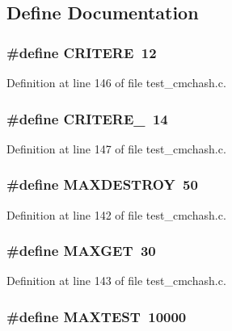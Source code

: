 \subsection{Define Documentation}
\subsubsection[{CRITERE}]{\setlength{\rightskip}{0pt plus 5cm}\#define CRITERE~12}\label{test__cmchash_8c_b2da1e226a5beeff3269ec19b1f2b0b9}




Definition at line 146 of file test\_\-cmchash.c.
\subsubsection[{CRITERE\_\-2}]{\setlength{\rightskip}{0pt plus 5cm}\#define CRITERE\_~14}\label{test__cmchash_8c_d449333f1ec8fe49765893cc1980d94d}




Definition at line 147 of file test\_\-cmchash.c.
\subsubsection[{MAXDESTROY}]{\setlength{\rightskip}{0pt plus 5cm}\#define MAXDESTROY~50}\label{test__cmchash_8c_428c97a2aa1643805f8b16275c702607}




Definition at line 142 of file test\_\-cmchash.c.
\subsubsection[{MAXGET}]{\setlength{\rightskip}{0pt plus 5cm}\#define MAXGET~30}\label{test__cmchash_8c_7d82597c4bd22fe023995390a5a90f95}




Definition at line 143 of file test\_\-cmchash.c.
\subsubsection[{MAXTEST}]{\setlength{\rightskip}{0pt plus 5cm}\#define MAXTEST~10000}\label{test__cmchash_8c_03d9dd35a7b43ebc597de16d46a0e845}




